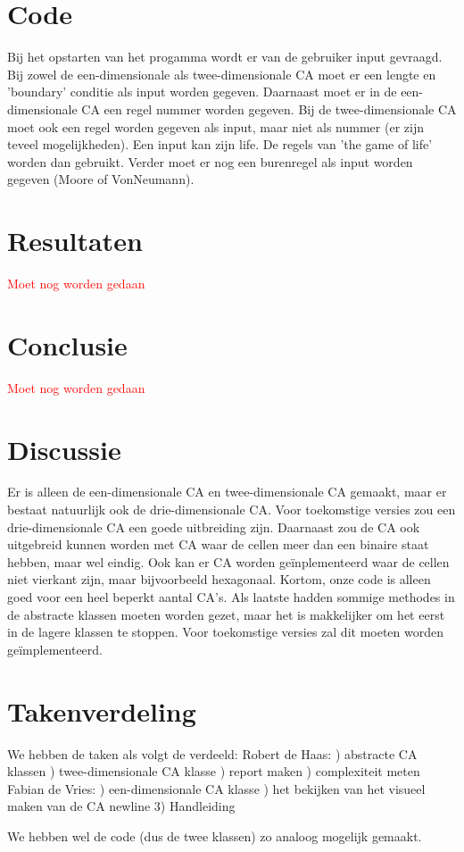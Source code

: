 \documentclass[12pt,a4paper]{article}
\begin{document}
\section*{Code}
Bij het opstarten van het progamma wordt er van de gebruiker input gevraagd.
\newline
Bij zowel de een-dimensionale als twee-dimensionale CA moet 
er een lengte en 'boundary' conditie als input worden gegeven.
Daarnaast moet er in de een-dimensionale CA een regel nummer worden gegeven.
Bij de twee-dimensionale CA moet ook een regel worden gegeven als input, maar niet als nummer (er zijn teveel mogelijkheden).
Een input kan zijn life. De regels van 'the game of life' worden dan gebruikt.
Verder moet er nog een burenregel als input worden gegeven (Moore of VonNeumann).

\section*{Resultaten}
\textcolor{red}{Moet nog worden gedaan}

\section*{Conclusie}
\textcolor{red}{Moet nog worden gedaan}

\section*{Discussie}
Er is alleen de een-dimensionale CA en twee-dimensionale 
CA gemaakt, maar er bestaat natuurlijk ook de drie-dimensionale CA.
Voor toekomstige versies zou een drie-dimensionale CA een goede uitbreiding zijn.
Daarnaast zou de CA ook uitgebreid kunnen worden met CA waar de cellen meer dan een binaire staat hebben, maar wel eindig.
Ook kan er CA worden geïnplementeerd waar de cellen niet vierkant zijn, maar bijvoorbeeld hexagonaal.
Kortom, onze code is alleen goed voor een heel beperkt aantal CA's.
Als laatste hadden sommige methodes in de abstracte klassen moeten worden gezet, maar het 
is makkelijker om het eerst in de lagere klassen te stoppen.
Voor toekomstige versies zal dit moeten worden geïmplementeerd.  

\newpage
\section*{Takenverdeling}
We hebben de taken als volgt de verdeeld:
\vspace{6pt}
\newline
Robert de Haas:
) abstracte CA klassen
) twee-dimensionale CA klasse
) report maken
) complexiteit meten
\vspace{6pt}
\newline
Fabian de Vries:
) een-dimensionale CA klasse
) het bekijken van het visueel maken van de CA
newline
3) Handleiding 


We hebben wel de code (dus de twee klassen) zo analoog mogelijk gemaakt.

  
\end{document}
